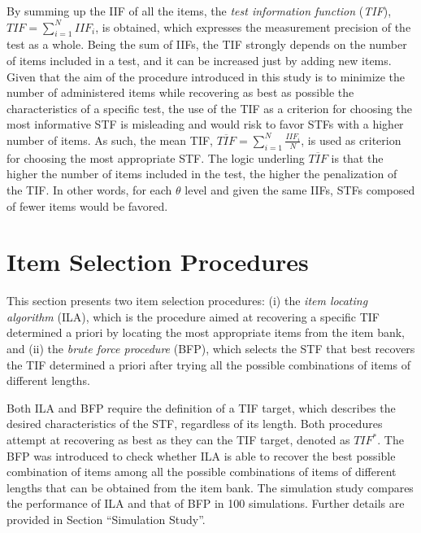 \documentclass[12pt, a4paper, titilepage]{article}
\begin{document}
By summing up the IIF of all the items, the \emph{test information function} (\emph{TIF}),  $\mathit{TIF} = \sum_{i = 1}^{N} IIF_i$, is obtained, which expresses the measurement precision of the test as a whole. Being the sum of IIFs, the TIF strongly depends on the number of items included in a test, and it can be increased just by adding new items. 
Given that the aim of the procedure introduced in this study is to minimize the number of administered items while recovering as best as possible the characteristics of a specific test, the use of the TIF as a criterion for choosing the most informative STF is misleading and would risk to favor STFs with a higher number of items.  
As such, the mean TIF, $\overline{\mathit{TIF}} = \sum_{i = 1}^{N} \frac{IIF_i}{N}$, is used as  criterion for choosing the most appropriate STF.
The logic underling $\overline{\mathit{TIF}}$ is that the higher the number of items included in the test, the higher the penalization of the TIF. In other words, for each $\theta$ level and given the same IIFs, STFs composed of fewer items would be favored. 

\section*{Item Selection Procedures}


This section presents two item selection procedures: (i) the \emph{item locating algorithm} (ILA), which is the procedure aimed at recovering a specific TIF determined a priori by locating the most appropriate items from the item bank, and (ii) the \emph{brute force procedure} (BFP), which selects the STF that best recovers the TIF determined a priori after trying all the possible combinations of items of different lengths. 

Both ILA and BFP require the definition of a TIF target, which describes the desired characteristics of the STF, regardless of its length. Both procedures attempt at recovering as best as they can the TIF target, denoted as $\mathit{TIF}^*$.
The BFP was introduced to check whether ILA is able to recover the best possible combination of items among all the possible combinations of items of different lengths that can be obtained from the item bank. The simulation study compares the performance of ILA and that of BFP in 100 simulations. Further details are provided in Section ``Simulation Study''.
\end{document}
